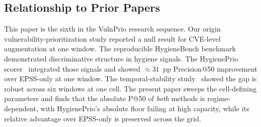 \subsection{Relationship to Prior Papers}

This paper is the sixth in the VulnPrio research sequence. Our origin
vulnerability-prioritization study reported a null result for CVE-level
augmentation at one window. The reproducible HygieneBench
benchmark~\cite{paper3hygienebench} demonstrated discriminative structure
in hygiene signals. The HygienePrio scorer~\cite{paper4hygieneprio} integrated those
signals and showed $\approx 31$~pp Precision@50
improvement over EPSS-only at one window. The temporal-stability study~\cite{paper5temporal}
showed the gap is robust across six windows at one cell. The present
paper sweeps the cell-defining parameters and finds that the absolute
P@50 of \textit{both} methods is regime-dependent, with HygienePrio's
absolute floor failing at high capacity, while its relative
advantage over EPSS-only is preserved across the grid.
